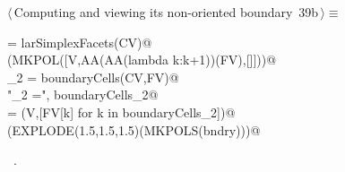 \documentclass[11pt,oneside]{article}	%
\begin{document}
\begin{flushleft} \small \label{scrap77}
\protect{}$\langle\,$Computing and viewing its non-oriented boundary\nobreak\ {\footnotesize 39b}$\,\rangle\equiv$
\vspace{-1ex}
\begin{list}{}{} \item
\mbox{}\verb@FV = larSimplexFacets(CV)@\\
\mbox{}\verb@VIEW(MKPOL([V,AA(AA(lambda k:k+1))(FV),[]]))@\\
\mbox{}\verb@boundaryCells_2 = boundaryCells(CV,FV)@\\
\mbox{}\verb@print "\nboundaryCells_2 =\n", boundaryCells_2@\\
\mbox{}\verb@bndry = (V,[FV[k] for k in boundaryCells_2])@\\
\mbox{}\verb@VIEW(EXPLODE(1.5,1.5,1.5)(MKPOLS(bndry)))@\\
\mbox{}\verb@@{\NWsep}
\end{list}
\vspace{-1ex}
\footnotesize\addtolength{\baselineskip}{-1ex}
\begin{list}{}{\setlength{\itemsep}{-\parsep}\setlength{\itemindent}{-\leftmargin}}
\item \NWtxtMacroRefIn\ .
\end{list}
\end{flushleft}
\end{document}
